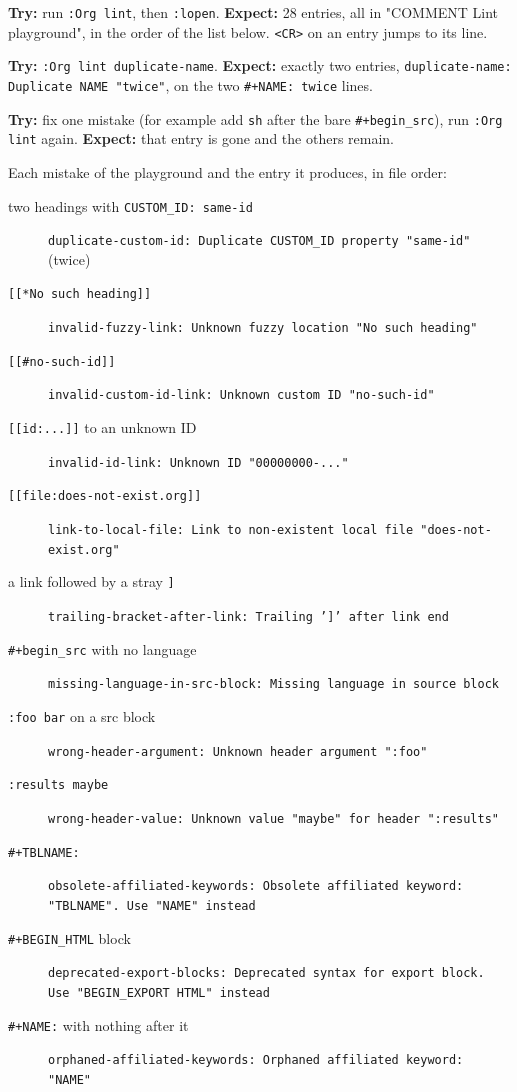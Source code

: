 \textbf{Try:} run \texttt{:Org lint}, then \texttt{:lopen}.
\textbf{Expect:} 28 entries, all in "COMMENT Lint playground", in the order of
the list below. \texttt{<CR>} on an entry jumps to its line.

\textbf{Try:} \texttt{:Org lint duplicate-name}.
\textbf{Expect:} exactly two entries, \texttt{duplicate-name: Duplicate NAME "twice"},
on the two \texttt{\#+NAME: twice} lines.

\textbf{Try:} fix one mistake (for example add \texttt{sh} after the bare
\texttt{\#+begin\_src}), run \texttt{:Org lint} again.
\textbf{Expect:} that entry is gone and the others remain.

Each mistake of the playground and the entry it produces, in file order:

\begin{description}
\item[{two headings with \texttt{CUSTOM\_ID: same-id}}] \texttt{duplicate-custom-id: Duplicate CUSTOM\_ID property "same-id"} (twice)
\item[{\texttt{[[*No such heading]]}}] \texttt{invalid-fuzzy-link: Unknown fuzzy location "No such heading"}
\item[{\texttt{[[\#no-such-id]]}}] \texttt{invalid-custom-id-link: Unknown custom ID "no-such-id"}
\item[{\texttt{[[id:...]]} to an unknown ID}] \texttt{invalid-id-link: Unknown ID "00000000-..."}
\item[{\texttt{[[file:does-not-exist.org]]}}] \texttt{link-to-local-file: Link to non-existent local file "does-not-exist.org"}
\item[{a link followed by a stray \texttt{]}}] \texttt{trailing-bracket-after-link: Trailing ']' after link end}
\item[{\texttt{\#+begin\_src} with no language}] \texttt{missing-language-in-src-block: Missing language in source block}
\item[{\texttt{:foo bar} on a src block}] \texttt{wrong-header-argument: Unknown header argument ":foo"}
\item[{\texttt{:results maybe}}] \texttt{wrong-header-value: Unknown value "maybe" for header ":results"}
\item[{\texttt{\#+TBLNAME:}}] \texttt{obsolete-affiliated-keywords: Obsolete affiliated keyword: "TBLNAME".  Use "NAME" instead}
\item[{\texttt{\#+BEGIN\_HTML} block}] \texttt{deprecated-export-blocks: Deprecated syntax for export block.  Use "BEGIN\_EXPORT HTML" instead}
\item[{\texttt{\#+NAME:} with nothing after it}] \texttt{orphaned-affiliated-keywords: Orphaned affiliated keyword: "NAME"}

\end{description}
